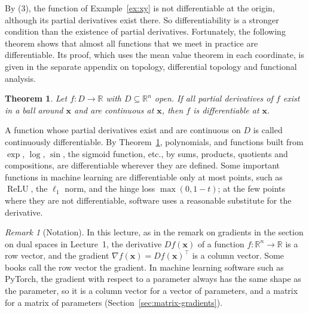 \documentclass[11pt]{article}
\theoremstyle{definition}
\theoremstyle{plain}
\newtheorem{theorem}[definition]{Theorem}
\theoremstyle{remark}
\newtheorem{remark}[definition]{Remark}
\DeclareMathOperator{\ReLU}{ReLU}
\begin{document}
By (3), the function of Example~\ref{ex:xy} is not differentiable at the origin, although its partial derivatives exist there. So differentiability is a stronger condition than the existence of partial derivatives. Fortunately, the following theorem shows that almost all functions that we meet in practice are differentiable. Its proof, which uses the mean value theorem in each coordinate, is given in the separate appendix on topology, differential topology and functional analysis.

\begin{theorem}\label{thm:C1}
    Let $f: D \to \mathbb{R}$ with $D \subseteq \mathbb{R}^n$ open. If all partial derivatives of $f$ exist in a ball around $\mathbf{x}$ and are continuous at $\mathbf{x}$, then $f$ is differentiable at $\mathbf{x}$.
\end{theorem}

A function whose partial derivatives exist and are continuous on $D$ is called continuously differentiable. By Theorem~\ref{thm:C1}, polynomials, and functions built from $\exp$, $\log$, $\sin$, the sigmoid function, etc., by sums, products, quotients and compositions, are differentiable wherever they are defined. Some important functions in machine learning are differentiable only at most points, such as $\ReLU$, the $\ell_1$ norm, and the hinge loss $\max(0, 1 - t)$; at the few points where they are not differentiable, software uses a reasonable substitute for the derivative.

\begin{remark}[Notation]
    In this lecture, as in the remark on gradients in the section on dual spaces in Lecture~1, the derivative $Df(\mathbf{x})$ of a function $f: \mathbb{R}^n \to \mathbb{R}$ is a row vector, and the gradient $\nabla f(\mathbf{x}) = Df(\mathbf{x})^\top$ is a column vector. Some books call the row vector the gradient. In machine learning software such as PyTorch, the gradient with respect to a parameter always has the same shape as the parameter, so it is a column vector for a vector of parameters, and a matrix for a matrix of parameters (Section~\ref{sec:matrix-gradients}).
\end{remark}
\end{document}
